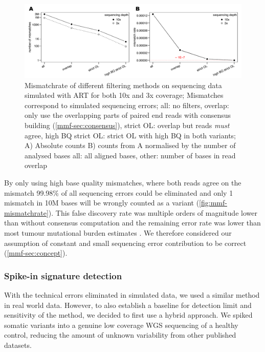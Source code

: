 \begin{figure}[ht]
\centering
\includegraphics[width=.99\linewidth]{Figures/MisMatchFinder/mismatchrateCleanSequencing.pdf}
\caption[Mismatchrate of different filtering methods]{Mismatchrate of different filtering methods on sequencing data simulated with ART\cite{Huang2011} for both 10x and 3x coverage; Mismatches correspond to simulated sequencing errors; all: no filters, overlap: only use the overlapping parts of paired end reads with consensus building (\protect\autoref{mmf-sec:consensus}), strict OL: overlap but reads \emph{must} agree, high BQ strict OL: strict OL with high BQ in both variants; A) Absolute counts B) counts from A normalised by the number of analysed bases all: all aligned bases, other: number of bases in read overlap}\label{fig:mmf-mismatchrate}
\end{figure}

By only using high base quality mismatches, where both reads agree on the mismatch 99.98\% of all sequencing errors could be eliminated and only 1 mismatch in 10M bases will be wrongly counted as a variant (\autoref{fig:mmf-mismatchrate}). This false discovery rate was multiple orders of magnitude lower than without consensus computation and the remaining error rate was lower than most tumour mutational burden estimates \cite{Alexandrov2020,Lawrence2013a}. We therefore considered our assumption of constant and small sequencing error contribution to be correct (\autoref{mmf-sec:concept}).


\subsubsection{Spike-in signature detection}
\label{mmf-sec:simSignatures}
With the technical errors eliminated in simulated data, we used a similar method in real world data. However, to also establish a baseline for detection limit and sensitivity of the method, we decided to first use a hybrid approach. We spiked somatic variants into a genuine low coverage WGS sequencing of a healthy control, reducing the amount of unknown variability from other published datasets.

